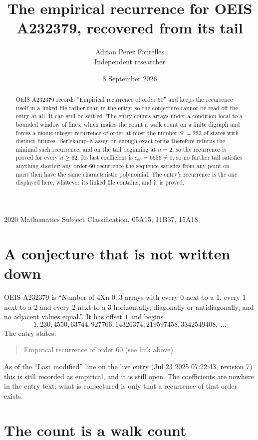 \documentclass[11pt,a4paper]{article}
\title{The empirical recurrence for OEIS A232379, recovered from its tail}
\author{Adrian Perez Fontelles\\ \small Independent researcher}
\date{8 September 2026}
\theoremstyle{plain}
\theoremstyle{definition}
\begin{document}
\maketitle

\begin{abstract}
OEIS A232379 records ``Empirical recurrence of order $60$'' and keeps the recurrence itself in
a linked file rather than in the entry, so the conjecture cannot be read off the entry at all.
It can still be settled. The entry counts arrays under a condition local to a bounded window of
lines, which makes the count a walk count on a finite digraph and forces a monic integer
recurrence of order at most the number $S'=223$ of states with distinct futures. Berlekamp--Massey on
enough exact terms therefore returns the minimal such recurrence, and on the tail beginning at $n=2$, so the recurrence is proved for every $n\ge62$.
Its last coefficient is $c_{60}=6656\neq0$, so no further tail satisfies anything
shorter; any order-$60$ recurrence the sequence satisfies from any point on must then have
the same characteristic polynomial. The entry's recurrence is the one displayed here, whatever
its linked file contains, and it is proved.
\end{abstract}

\noindent\small 2020 Mathematics Subject Classification. 05A15, 11B37, 15A18.\normalsize

\section{A conjecture that is not written down}

OEIS A232379 is ``Number of 4Xn 0..3 arrays with every 0 next to a 1, every 1 next to a 2 and every 2 next to a 3 horizontally, diagonally or antidiagonally, and no adjacent values equal.''. It has offset $1$ and begins
\[
1, 230, 4550, 63744, 927706, 14326374, 219597458, 3342549408,\ \dots
\]
The entry states:
\begin{quote}
Empirical recurrence of order 60 (see link above)
\end{quote}
As of the ``Last modified'' line on the live entry (Jul 23 2025 07:22:43, revision 7)
this is still recorded as empirical, and it is still open. The coefficients are nowhere in the
entry text: what is conjectured is only that a recurrence of that order exists.

\section{The count is a walk count}
\end{document}
